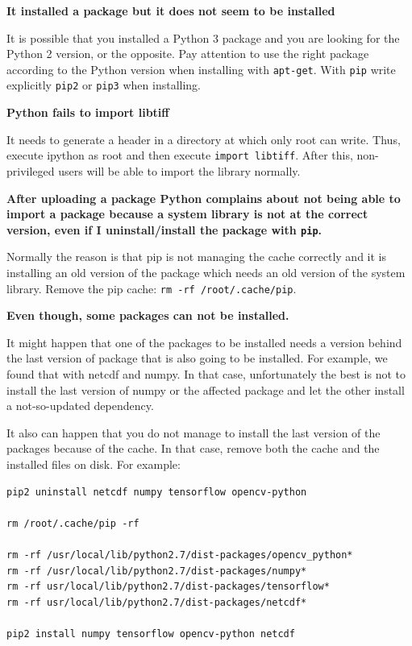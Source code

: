 \documentclass[a4paper,12pt]{article}
\begin{document}
\textbf{It installed a package but it does not seem to be installed}

It is possible that you installed a Python 3 package and you are looking for the Python 2 version, or the opposite. Pay attention to use the right package according to the Python version when installing with {\tt apt-get}. With {\tt pip} write explicitly {\tt pip2} or {\tt pip3} when installing.
\vspace{0.5cm}


\textbf{Python fails to import libtiff}

It needs to generate a header in a directory at which only root can write. Thus, execute ipython as root and then execute {\tt import libtiff}. After this, non-privileged users will be able to import the library normally.
\vspace{0.5cm}

\textbf{After uploading a package Python complains about not being able to import a package because a system library is not at the correct version, even if I uninstall/install the package with {\tt pip}.}

Normally the reason is that pip is not managing the cache correctly and it is installing an old version of the package which needs an old version of the system library. Remove the pip cache: {\tt rm -rf /root/.cache/pip}.
\vspace{0.5cm}

\textbf{Even though, some packages can not be installed.}

It might happen that one of the packages to be installed needs a version behind the last version of package that is also going to be installed. For example, we found that with netcdf and numpy. In that case, unfortunately the best is not to install the last version of numpy or the affected package and let the other install a not-so-updated dependency.

It also can happen that you do not manage to install the last version of the packages because of the cache. In that case, remove both the cache and the installed files on disk. For example:

\begin{verbatim}
pip2 uninstall netcdf numpy tensorflow opencv-python

rm /root/.cache/pip -rf

rm -rf /usr/local/lib/python2.7/dist-packages/opencv_python*
rm -rf /usr/local/lib/python2.7/dist-packages/numpy*
rm -rf usr/local/lib/python2.7/dist-packages/tensorflow*
rm -rf usr/local/lib/python2.7/dist-packages/netcdf*

pip2 install numpy tensorflow opencv-python netcdf
\end{verbatim}
\vspace{0.5cm}
\end{document}
